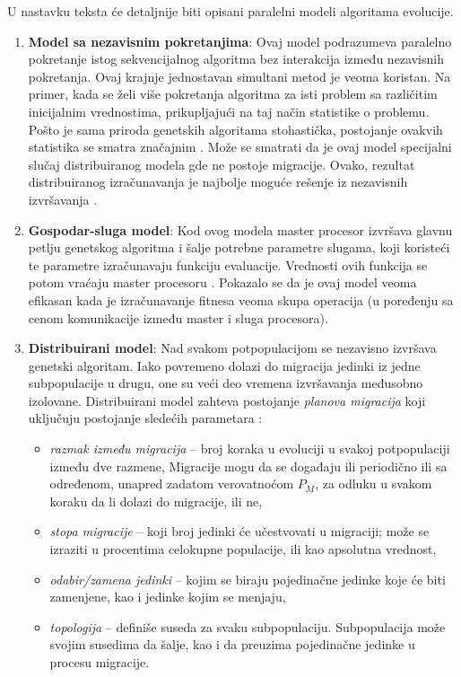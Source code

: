 \documentclass[a4paper]{article}
\begin{document}
U nastavku teksta će detaljnije biti opisani paralelni modeli algoritama evolucije.

\begin{enumerate}
    \item \textbf{Model sa nezavisnim pokretanjima}: \newline \indent \indent Ovaj model podrazumeva paralelno pokretanje istog sekvencijalnog algoritma bez interakcija između nezavisnih pokretanja. Ovaj krajnje jednostavan simultani metod je veoma koristan. Na primer, kada se želi više pokretanja algoritma za isti problem sa različitim inicijalnim vrednostima, prikupljajući na taj način statistike o problemu. Pošto je sama priroda genetskih algoritama stohastička, postojanje ovakvih statistika se smatra značajnim \cite{alba}.
    \newline
    Može se smatrati da je ovaj model specijalni slučaj distribuiranog modela gde ne postoje migracije. Ovako, rezultat distribuiranog izračunavanja je najbolje moguće rešenje iz nezavisnih izvršavanja \cite{alba}. 
    \item \textbf{Gospodar-sluga model}: \newline \indent Kod ovog modela master procesor izvršava glavnu petlju genetskog algoritma i šalje potrebne parametre slugama, koji koristeći te parametre izračunavaju funkciju evaluacije. Vrednosti ovih funkcija se potom vraćaju master procesoru \cite{alba}.
    \indent Pokazalo se da je ovaj model veoma efikasan kada je izračunavanje fitnesa veoma skupa operacija (u poređenju sa cenom komunikacije između master i sluga procesora).
    \item \textbf{Distribuirani model}: \newline \indent Nad svakom potpopulacijom se nezavisno izvršava genetski algoritam. Iako povremeno dolazi do migracija jedinki iz jedne subpopulacije u drugu, one su veći deo vremena izvršavanja međusobno izolovane. Distribuirani model zahteva postojanje \textit{planova migracija} koji uključuju postojanje sledećih parametara \cite{alba}:
    \begin{itemize}
        \item \textit{razmak između migracija} -- broj koraka u evoluciji u svakoj potpopulaciji između dve razmene, Migracije mogu da se događaju ili periodično ili sa određenom, unapred zadatom verovatnoćom $P_M$, za odluku u svakom koraku da li dolazi do migracije, ili ne,
        \item \textit{stopa migracije} -- koji broj jedinki će učestvovati u migraciji; može se izraziti u procentima celokupne populacije, ili kao apsolutna vrednost,
        \item \textit{odabir/zamena jedinki} -- kojim se biraju pojedinačne jedinke koje će biti zamenjene, kao i jedinke kojim se menjaju,
        \item \textit{topologija} -- definiše suseda za svaku subpopulaciju. Subpopulacija može svojim susedima da šalje, kao i da preuzima pojedinačne jedinke u procesu migracije.  
    \end{itemize}{}
\end{enumerate}{}
\end{document}
